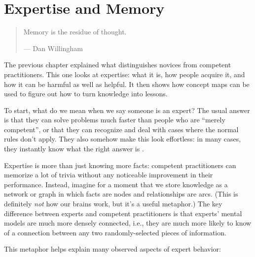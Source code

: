 \chapter{Expertise and Memory}\label{s:memory}

\begin{quote}\setlength{\parindent}{0pt}
Memory is the residue of thought.

--- Dan Willingham
\end{quote}

The previous chapter explained what distinguishes novices from competent
practitioners. This one looks at expertise: what it is, how people
acquire it, and how it can be harmful as well as helpful. It then shows
how concept maps can be used to figure out how to turn knowledge into
lessons.

To start, what do we mean when we say someone is an expert? The usual
answer is that they can solve problems much faster than people who are
``merely competent'', or that they can recognize and deal with cases
where the normal rules don't apply. They also somehow make this look
effortless: in many cases, they instantly know what the right answer is
\cite{Parn2017}.

Expertise is more than just knowing more facts: competent practitioners
can memorize a lot of trivia without any noticeable improvement in their
performance. Instead, imagine for a moment that we store knowledge as a
network or graph in which facts are nodes and relationships are arcs.
(This is definitely \emph{not} how our brains work, but it's a useful
metaphor.) The key difference between experts and competent
practitioners is that experts' mental models are much more densely
connected, i.e., they are much more likely to know of a connection
between any two randomly-selected pieces of information.

This metaphor helps explain many observed aspects of expert behavior:


